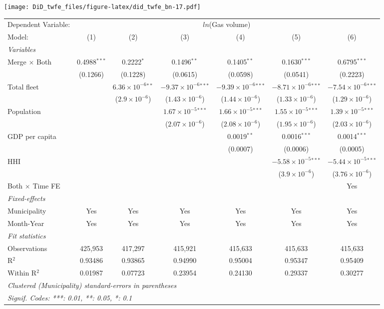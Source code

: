 \documentclass[
]{article}
\begin{document}
\texttt{[image: DiD\_twfe\_files/figure-latex/did\_twfe\_bn-17.pdf]}

\begin{tabular}{lcccccc}
\tabularnewline\midrule\midrule
Dependent Variable:&\multicolumn{6}{c}{$ln$(Gas volume)}\\
Model:&(1) & (2) & (3) & (4) & (5) & (6)\\
\midrule \emph{Variables}&   &   &   &   &   &  \\
Merge $\times $ Both & 0.4988$^{***}$ & 0.2222$^{*}$ & 0.1496$^{**}$ & 0.1405$^{**}$ & 0.1630$^{***}$ & 0.6795$^{***}$\\
  &(0.1266) & (0.1228) & (0.0615) & (0.0598) & (0.0541) & (0.2223)\\
Total fleet &    & $6.36\times 10^{-6}$$^{**}$ & $-9.37\times 10^{-6}$$^{***}$ & $-9.39\times 10^{-6}$$^{***}$ & $-8.71\times 10^{-6}$$^{***}$ & $-7.54\times 10^{-6}$$^{***}$\\
  &   & ($2.9\times 10^{-6}$) & ($1.43\times 10^{-6}$) & ($1.44\times 10^{-6}$) & ($1.33\times 10^{-6}$) & ($1.29\times 10^{-6}$)\\
Population &    &    & $1.67\times 10^{-5}$$^{***}$ & $1.66\times 10^{-5}$$^{***}$ & $1.55\times 10^{-5}$$^{***}$ & $1.39\times 10^{-5}$$^{***}$\\
  &   &    & ($2.07\times 10^{-6}$) & ($2.08\times 10^{-6}$) & ($1.95\times 10^{-6}$) & ($2.03\times 10^{-6}$)\\
GDP per capita &    &    &    & 0.0019$^{**}$ & 0.0016$^{***}$ & 0.0014$^{***}$\\
  &   &    &    & (0.0007) & (0.0006) & (0.0005)\\
HHI &    &    &    &    & $-5.58\times 10^{-5}$$^{***}$ & $-5.44\times 10^{-5}$$^{***}$\\
  &   &    &    &    & ($3.9\times 10^{-6}$) & ($3.76\times 10^{-6}$)\\
Both $\times$ Time FE &  &  &  &  &  & Yes\\
\midrule \emph{Fixed-effects}&   &   &   &   &   &  \\
Municipality & Yes & Yes & Yes & Yes & Yes & Yes\\
Month-Year & Yes & Yes & Yes & Yes & Yes & Yes\\
\midrule \emph{Fit statistics}&  & & & & & \\
Observations & 425,953&417,297&415,921&415,633&415,633&415,633\\
R$^2$ & 0.93486&0.93865&0.94990&0.95004&0.95347&0.95409\\
Within R$^2$ & 0.01987&0.07723&0.23954&0.24130&0.29337&0.30277\\
\midrule\midrule\multicolumn{7}{l}{\emph{Clustered (Municipality) standard-errors in parentheses}}\\
\multicolumn{7}{l}{\emph{Signif. Codes: ***: 0.01, **: 0.05, *: 0.1}}\\
\end{tabular}
\end{document}

